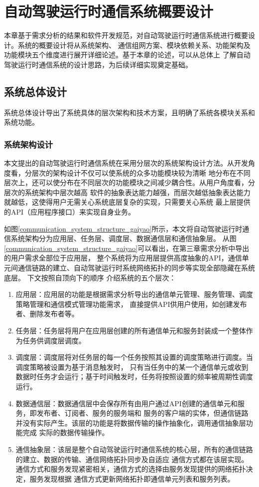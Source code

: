 \chapter{自动驾驶运行时通信系统概要设计}
本章基于需求分析的结果和软件开发规范，对自动驾驶运行时通信系统进行概要设计。系统的概要设计将从系统架构、
通信组网方案、模块依赖关系、功能架构及功能模块五个维度进行展开详细论述。基于本章的论述，可以从总体上
了解自动驾驶运行时通信系统的设计思路，为后续详细实现奠定基础。

\section{系统总体设计}
系统总体设计导出了系统具体的层次架构和技术方案，且明确了系统各模块关系和系统功能。
\subsection{系统架构设计}
本文提出的自动驾驶运行时通信系统在采用分层次的系统架构设计方法。从开发角度看，分层次的架构设计不仅可以使系统的众多功能模块较为清晰
地分布在不同层次上，还可以使分布在不同层次的功能模块之间减少耦合性。从用户角度看，分层次的系统架构中层次越高
软件的抽象表达能力越强，而层次越低抽象表达能力就越低，这使得用户无需关心系统底层复杂的实现，只需要关心系统
最上层提供的API（应用程序接口）来实现自身业务。

如图\ref{communication_system_structure_gaiyao}所示，本文将自动驾驶运行时通信系统架构分为应用层、任务层、调度层、数据通信层和通信抽象层。
从图\ref{communication_system_structure_gaiyao}可以看出，在第三章需求分析中导出的用户需求全部位于应用层，
整个系统将为应用层提供高度抽象的API，通信单元间通信链路的建立、自动驾驶运行时系统网络拓扑的同步等实现全部隐藏在系统底层。
下文按照自顶向下的顺序
介绍系统的五个层次：
\begin{enumerate}
    \item 应用层：应用层的功能是根据需求分析导出的通信单元管理、服务管理、调度策略管理和通信模式管理功能需求，
    直接提供API供用户使用，如创建发布者、删除发布者等。
    \item 任务层：任务层将用户在应用层创建的所有通信单元和服务封装成一个整体作为任务供调度层调度。
    \item 调度层：调度层将对任务层的每一个任务按照其设置的调度策略进行调度。当调度策略被设置为基于消息触发时，
    只有当任务中的某一个通信单元或收到数据时任务才会运行；基于时间触发时，任务将按照设置的频率被周期性调度运行。
    \item 数据通信层：数据通信层中会保存所有由用户通过API创建的通信单元和服务，即发布者、订阅者、服务的服务端和
    服务的客户端的实体，但通信链路并没有实际产生。该层的功能是将数据传输的操作抽象化，调用通信抽象层功能完成
    实际的数据传输操作。
    \item 通信抽象层：该层是整个自动驾驶运行时通信系统的核心层，所有的通信链路的建立、数据的传输、通信网络拓扑同步及自适应
    通信方式都在该层实现。通信方式和服务发现紧密相关，通信方式的选择由服务发现提供的网络拓扑决定，服务发现根据
    通信方式更新网络拓扑即通信单元列表和服务列表。
\end{enumerate}

